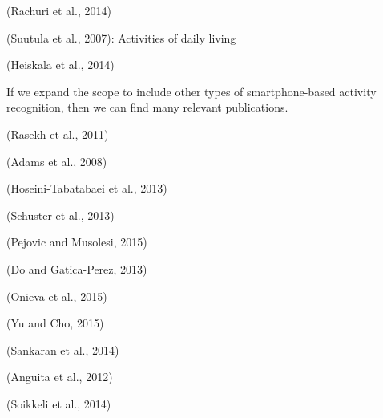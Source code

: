 \cite{Reddy2010}
\cite{Bancroft2012}

(Rachuri et al., 2014)

(Suutula et al., 2007): Activities of daily living

(Heiskala et al., 2014) %

If we expand the scope to include other types of smartphone-based activity recognition, then we can find many relevant publications.

(Rasekh et al., 2011) %

(Adams et al., 2008)

(Hoseini-Tabatabaei et al., 2013)

(Schuster et al., 2013) %

(Pejovic and Musolesi, 2015) %

(Do and Gatica-Perez, 2013) %



(Onieva et al., 2015) %

(Yu and Cho, 2015)

(Sankaran et al., 2014)


(Anguita et al., 2012)

(Soikkeli et al., 2014) %

